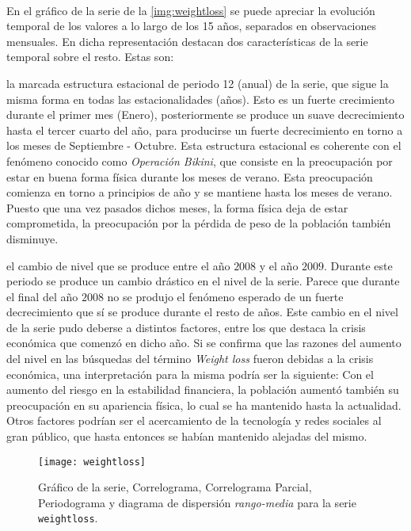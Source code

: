 \documentclass[a4paper, spanish]{article}
\begin{document}
      \paragraph{}
      En el gráfico de la serie de la \autoref{img:weightloss} se puede apreciar la evolución temporal de los valores a lo largo de los 15 años, separados en observaciones mensuales. En dicha representación destacan dos características de la serie temporal sobre el resto. Estas son:
        \begin{enumerate*}[label=(\arabic*)]
          \item la marcada estructura estacional de periodo 12 (anual) de la serie, que sigue la misma forma en todas las estacionalidades (años). Esto es un fuerte crecimiento durante el primer mes (Enero), posteriormente se produce un suave decrecimiento hasta el tercer cuarto del año, para producirse un fuerte decrecimiento en torno a los meses de Septiembre - Octubre. Esta estructura estacional es coherente con el fenómeno conocido como \emph{Operación Bikini}, que consiste en la preocupación por estar en buena forma física durante los meses de verano. Esta preocupación comienza en torno a principios de año y se mantiene hasta los meses de verano. Puesto que una vez pasados dichos meses, la forma física deja de estar comprometida, la preocupación por la pérdida de peso de la población también disminuye.
          \item el cambio de nivel que se produce entre el año $2008$ y el año $2009$. Durante este periodo se produce un cambio drástico en el nivel de la serie. Parece que durante el final del año $2008$ no se produjo el fenómeno esperado de un fuerte decrecimiento que sí se produce durante el resto de años. Este cambio en el nivel de la serie pudo deberse a distintos factores, entre los que destaca la crisis económica que comenzó en dicho año. Si se confirma que las razones del aumento del nivel en las búsquedas del término \emph{Weight loss} fueron debidas a la crisis económica, una interpretación para la misma podría ser la siguiente: Con el aumento del riesgo en la estabilidad financiera, la población aumentó también su preocupación en su apariencia física, lo cual se ha mantenido hasta la actualidad. Otros factores podrían ser el acercamiento de la tecnología y redes sociales al gran público, que hasta entonces se habían mantenido alejadas del mismo.
        \end{enumerate*}

      \begin{figure}[htb!]
        \texttt{[image: weightloss]}
        \caption{Gráfico de la serie, Correlograma, Correlograma Parcial, Periodograma y diagrama de dispersión \emph{rango-media} para la serie \texttt{weightloss}.}
        \label{img:weightloss}
      \end{figure}
\end{document}
